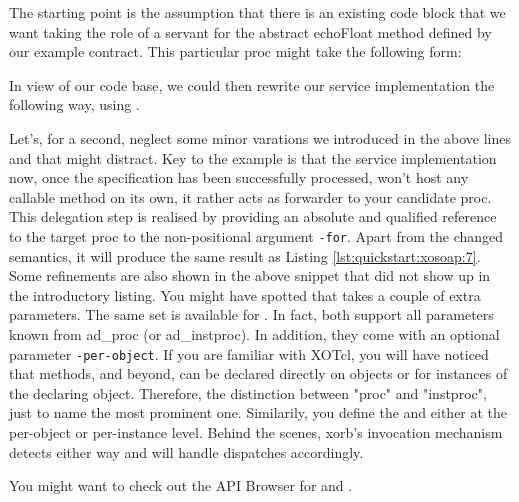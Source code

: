 The starting point is the assumption that there is an existing code block that we want taking the role of a servant for the abstract echoFloat method defined by our example contract. This particular proc might take the following form:


 
In view of our code base, we could then rewrite our service implementation the following way, using .



Let's, for a second, neglect some minor varations we introduced in the above lines and that might distract. Key to the example is that the service implementation now, once the specification has been successfully processed, won't host any callable method on its own, it rather acts as forwarder to your candidate proc. This delegation step is realised by providing an absolute and qualified reference to the target proc to the non-positional argument \lstinline!-for!. Apart from the changed semantics, it will produce the same result as Listing \ref{lst:quickstart:xosoap:7}. Some refinements are also shown in the above snippet that did not show up in the introductory listing.
You might have spotted that  takes a couple of extra parameters. The same set is available for . In fact, both support all parameters known from ad\_proc (or ad\_instproc). In addition, they come with an optional parameter \lstinline!-per-object!. If you are familiar with XOTcl, you will have noticed that methods, and beyond, can be declared directly on objects or for instances of the declaring object. Therefore, the distinction between "proc" and "instproc", just to name the most prominent one. Similarily, you define the  and  either at the per-object or per-instance level. Behind the scenes, xorb's invocation mechanism detects either way and will handle dispatches accordingly.
\begin{hints}
\item You might want to check out the API Browser for  and .
\end{hints}
